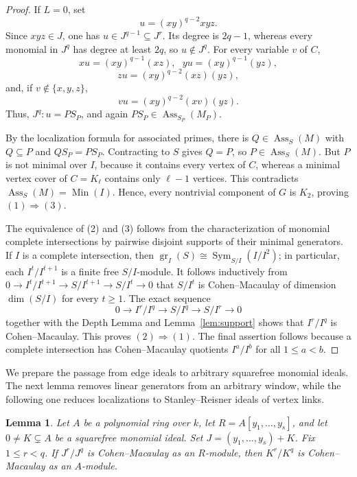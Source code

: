 \documentclass[12pt]{amsart}
\theoremstyle{plain}
\newtheorem{lemma}[theorem]{Lemma}
\theoremstyle{definition}
\theoremstyle{remark}
\begin{document}
\begin{proof}
If $L=0$, set
$$
u=(xy)^{q-2}xyz.
$$
Since $xyz\in J$, one has $u\in J^{q-1}\subseteq J^r$. Its degree is
$2q-1$, whereas every monomial in $J^q$ has degree at least $2q$, so
$u\notin J^q$. For every variable $v$ of $C$,
$$
xu=(xy)^{q-1}(xz),\text{ } yu=(xy)^{q-1}(yz),
$$
$$
zu=(xy)^{q-2}(xz)(yz),
$$
and, if $v\notin\{x,y,z\}$,
$$
vu=(xy)^{q-2}(xv)(yz).
$$
Thus, $J^q:u=PS_P$, and again $PS_P\in\operatorname{Ass}_{S_P}(M_P)$.

By the localization formula for associated primes, there is
$Q\in\operatorname{Ass}_S(M)$ with $Q\subseteq P$ and
$QS_P=PS_P$. Contracting to $S$ gives $Q=P$, so
$P\in\operatorname{Ass}_S(M)$. But $P$ is not minimal over $I$,
because it contains every vertex of $C$, whereas a minimal vertex cover of
$C=K_\ell$ contains only $\ell-1$ vertices. This contradicts
$\operatorname{Ass}_S(M)=\operatorname{Min}(I)$. Hence, every nontrivial
component of $G$ is $K_2$, proving $(1)\Rightarrow(3)$.

The equivalence of (2) and (3) follows from the characterization of monomial
complete intersections by pairwise disjoint supports of their minimal
generators. If $I$ is a complete intersection, then
$\operatorname{gr}_I(S)\cong\operatorname{Sym}_{S/I}(I/I^2)$; in particular,
each $I^t/I^{t+1}$ is a finite free $S/I$-module. It follows inductively from
$0\to I^t/I^{t+1}\to S/I^{t+1}\to S/I^t\to0$ that $S/I^t$ is
Cohen--Macaulay of dimension $\dim(S/I)$ for every $t\ge1$. The exact
sequence
$$
0\longrightarrow I^r/I^q\longrightarrow S/I^q\longrightarrow S/I^r
\longrightarrow0
$$
together with the Depth Lemma and Lemma~\ref{lem:support} shows that
$I^r/I^q$ is Cohen--Macaulay. This
proves $(2)\Rightarrow(1)$. The final assertion follows because a complete
intersection has Cohen--Macaulay quotients $I^a/I^b$ for all $1\le a<b$.
\end{proof}

We prepare the passage from edge ideals to arbitrary squarefree monomial
ideals. The next lemma removes linear generators from an arbitrary window,
while the following one reduces localizations to Stanley--Reisner ideals of
vertex links.

\begin{lemma}\label{lem:linear-generators}
Let $A$ be a polynomial ring over $k$, let $R=A[y_1,\ldots,y_s]$, and let
$0\neq K\subsetneq A$ be a squarefree monomial ideal. Set
$J=(y_1,\ldots,y_s)+K$. Fix $1\le r<q$. If $J^r/J^q$ is Cohen--Macaulay as
an $R$-module, then $K^r/K^q$ is Cohen--Macaulay as an $A$-module.
\end{lemma}
\end{document}
